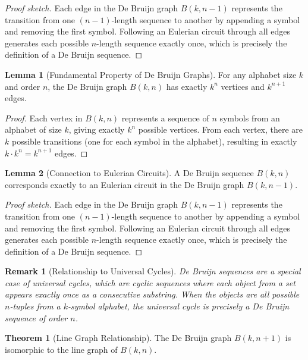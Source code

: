\documentclass{article}
\newtheorem{remark}{Remark}
\theoremstyle{definition}
\newtheorem{theorem}{Theorem}
\newtheorem{lemma}{Lemma}
\begin{document}
\begin{proof}[Proof sketch]
Each edge in the De Bruijn graph $B(k,n-1)$ represents the transition from one $(n-1)$-length sequence to another by appending a symbol and removing the first symbol. Following an Eulerian circuit through all edges generates each possible $n$-length sequence exactly once, which is precisely the definition of a De Bruijn sequence.
\end{proof}
\begin{lemma}[Fundamental Property of De Bruijn Graphs]
For any alphabet size $k$ and order $n$, the De Bruijn graph $B(k,n)$ has exactly $k^n$ vertices and $k^{n+1}$ edges.
\end{lemma}
\begin{proof}
Each vertex in $B(k,n)$ represents a sequence of $n$ symbols from an alphabet of size $k$, giving exactly $k^n$ possible vertices. From each vertex, there are $k$ possible transitions (one for each symbol in the alphabet), resulting in exactly $k \cdot k^n = k^{n+1}$ edges.
\end{proof}
\begin{lemma}[Connection to Eulerian Circuits]
A De Bruijn sequence $B(k,n)$ corresponds exactly to an Eulerian circuit in the De Bruijn graph $B(k,n-1)$.
\end{lemma}
\begin{proof}[Proof sketch]
Each edge in the De Bruijn graph $B(k,n-1)$ represents the transition from one $(n-1)$-length sequence to another by appending a symbol and removing the first symbol. Following an Eulerian circuit through all edges generates each possible $n$-length sequence exactly once, which is precisely the definition of a De Bruijn sequence.
\end{proof}
\begin{remark}[Relationship to Universal Cycles]
De Bruijn sequences are a special case of universal cycles, which are cyclic sequences where each object from a set appears exactly once as a consecutive substring. When the objects are all possible $n$-tuples from a $k$-symbol alphabet, the universal cycle is precisely a De Bruijn sequence of order $n$.
\end{remark}
\begin{theorem}[Line Graph Relationship]
The De Bruijn graph $B(k,n+1)$ is isomorphic to the line graph of $B(k,n)$.
\end{theorem}
\end{document}
